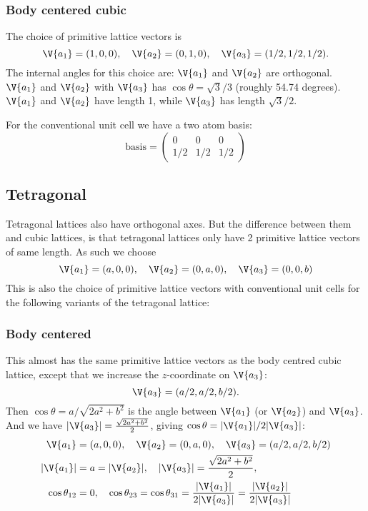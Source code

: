 \documentclass[main.tex]{subfiles}
\begin{document}
	\subsubsection*{Body centered cubic}
	The choice of primitive lattice vectors is
	\begin{equation*}
		\V{a_1} = (1,0,0),\quad \V{a_2} = (0,1,0),\quad \V{a_3} = (1/2,1/2,1/2).
	\end{equation*}
	The internal angles for this choice are: $\V{a_1}$ and $\V{a_2}$ are orthogonal. $\V{a_1}$ and $\V{a_2}$ with $\V{a_3}$ has $\cos \theta = \sqrt{3}/3 $ (roughly 54.74 degrees). $ \V{a_1} $ and $ \V{a_2} $ have length 1, while $ \V{a_3} $ has length $\sqrt{3}/2$.
	
	For the conventional unit cell we have a two atom basis:
	\begin{equation*}
		\text{basis} = \begin{pmatrix}
		0 & 0 & 0 \\
		1/2 & 1/2 & 1/2
		\end{pmatrix}
	\end{equation*}
	
	\subsection*{Tetragonal}
	Tetragonal lattices also have orthogonal axes. But the difference between them and cubic lattices, is that tetragonal lattices only have 2 primitive lattice vectors of same length. As such we choose
	\begin{equation*}
		\V{a_1} = (a, 0, 0), \quad \V{a_2} = (0, a, 0), \quad \V{a_3}=(0, 0, b)
	\end{equation*}
	This is also the choice of primitive lattice vectors with conventional unit cells for the following variants of the tetragonal lattice:
	
	\subsubsection*{Body centered}
	This almost has the same primitive lattice vectors as the body centred cubic lattice, except that we increase the $ z $-coordinate on $\V{a_3}$:
	\begin{equation*}
		\V{a_3}= (a/2,a/2,b/2).
	\end{equation*}
	Then $\cos \theta = a/\sqrt{2a^2+b^2} $ is the angle between $ \V{a_1} $ (or $ \V{a_2} $) and $ \V{a_3} $. And we have $|\V{a_3}| = \frac{\sqrt{2a^2+b^2}}{2}$, giving $ \cos \theta = |\V{a_1}|/2|\V{a_3}|$:
	\begin{align*}
		\V{a_1} &= (a,0,0), \quad \V{a_2} = (0,a,0), \quad \V{a_3} = (a/2,a/2,b/2) \\
		|\V{a_1}| &= a = |\V{a_2}|, \quad |\V{a_3}| = \frac{\sqrt{2a^2+b^2}}{2}, \\
		\cos \theta_{12} &= 0, \quad \cos \theta_{23} = \cos \theta_{31} = \frac{|\V{a_1}|}{2|\V{a_3}|}  = \frac{|\V{a_2}|}{2 |\V{a_3}|}
	\end{align*}
	
\end{document}
